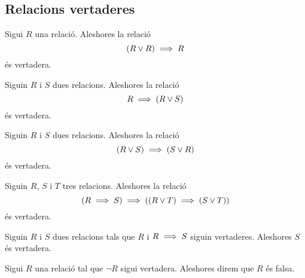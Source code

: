 \documentclass[../Apunts.tex]{subfiles}
\begin{document}
	\subsection{Relacions vertaderes}
	\begin{axiom}
		\label{axiom:relacions 1}
		Sigui \(R\) una relació. Aleshores la relació
		\[(R\lor R)\implies R\]
		és vertadera.
	\end{axiom}
	\begin{axiom}
		\label{axiom:relacions 2}
		Siguin \(R\) i \(S\) dues relacions. Aleshores la relació
		\[R\implies(R\lor S)\]
		és vertadera.
	\end{axiom}
	\begin{axiom}
		\label{axiom:relacions 3}
		Siguin \(R\) i \(S\) dues relacions. Aleshores la relació
		\[(R\lor S)\implies(S\lor R)\]
		és vertadera.
	\end{axiom}
	\begin{axiom}
		\label{axiom:relacions 4}
		Siguin \(R\), \(S\) i \(T\) tres relacions. Aleshores la relació
		\[(R\implies S)\implies((R\lor T)\implies(S\lor T))\]
		és vertadera.
	\end{axiom}
	\begin{axiom}
		\label{axiom:relacions 5}
		Siguin \(R\) i \(S\) dues relacions tals que \(R\) i \(R\implies S\) siguin vertaderes. Aleshores \(S\) és vertadera.
	\end{axiom}
	\begin{definition}
		Sigui \(R\) una relació tal que \(\lnot R\) sigui vertadera. Aleshores direm que \(R\) és falsa.
	\end{definition}
\end{document}
